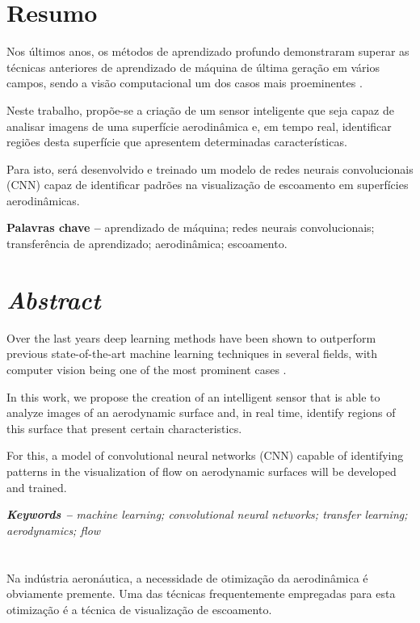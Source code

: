 \documentclass[12pt, a4paper]{article}
\begin{document}
\makeourtitle

\tableofcontents

\newpage
\section*{Resumo}
Nos últimos anos, os métodos de aprendizado profundo demonstraram superar as técnicas anteriores de aprendizado de máquina de última geração em vários campos, sendo a visão computacional um dos casos mais proeminentes \cite{Voulodimos2018}.

Neste trabalho, propõe-se a criação de um sensor inteligente que seja capaz de analisar imagens de uma superfície aerodinâmica e, em tempo real, identificar regiões desta superfície que apresentem determinadas características.

Para isto, será desenvolvido e treinado um modelo de redes neurais convolucionais (CNN) capaz de identificar padrões na visualização de escoamento em superfícies aerodinâmicas.

\textbf{Palavras chave --} aprendizado de máquina; redes neurais convolucionais; transferência de aprendizado; aerodinâmica; escoamento.


\newpage
\section*{\emph{Abstract}}
\begin{em}
Over the last years deep learning methods have been shown to outperform previous state-of-the-art machine learning techniques in several fields, with computer vision being one of the most prominent cases \cite{Voulodimos2018}.

In this work, we propose the creation of an intelligent sensor that is able to analyze images of an aerodynamic surface and, in real time, identify regions of this surface that present certain characteristics.

For this, a model of convolutional neural networks (CNN) capable of identifying patterns in the visualization of flow on aerodynamic surfaces will be developed and trained.
\end{em}

\textit{\textbf{Keywords --} machine learning; convolutional neural networks; transfer learning; aerodynamics; flow}


\newpage
\section{\sectionI}
\label{sec:intro}
Na indústria aeronáutica, a necessidade de otimização da aerodinâmica é obviamente premente. Uma das técnicas frequentemente empregadas para esta otimização é a técnica de visualização de escoamento.
\end{document}
